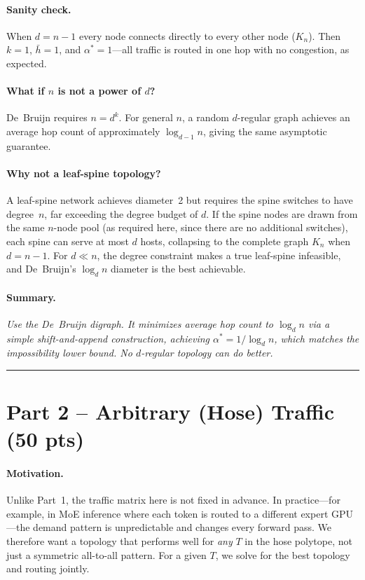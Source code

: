 \documentclass[11pt]{article}
\begin{document}
\paragraph{Sanity check.}
When $d = n-1$ every node connects directly to every other node
($K_n$). Then $k=1$, $\bar{h}=1$, and $\alpha^*=1$---all traffic is
routed in one hop with no congestion, as expected.

\paragraph{What if $n$ is not a power of $d$?}
De~Bruijn requires $n = d^k$. For general $n$, a random $d$-regular
graph achieves an average hop count of approximately $\log_{d-1} n$,
giving the same asymptotic guarantee.

\paragraph{Why not a leaf-spine topology?}
A leaf-spine network achieves diameter~2 but requires the spine switches
to have degree~$n$, far exceeding the degree budget of $d$. If the
spine nodes are drawn from the same $n$-node pool (as required here,
since there are no additional switches), each spine can serve at most
$d$ hosts, collapsing to the complete graph $K_n$ when $d = n-1$. For
$d \ll n$, the degree constraint makes a true leaf-spine infeasible, and
De~Bruijn's $\log_d n$ diameter is the best achievable.

\paragraph{Summary.}
\emph{Use the De~Bruijn digraph. It minimizes average hop count to
$\log_d n$ via a simple shift-and-append construction, achieving
$\alpha^* = 1/\log_d n$, which matches the impossibility lower bound.
No $d$-regular topology can do better.}

\bigskip\hrule\bigskip

\section*{Part 2 -- Arbitrary (Hose) Traffic (50 pts)}

\paragraph{Motivation.}
Unlike Part~1, the traffic matrix here is not fixed in advance.
In practice---for example, in MoE inference where each token is routed
to a different expert GPU---the demand pattern is unpredictable and
changes every forward pass. We therefore want a topology that performs
well for \emph{any} $T$ in the hose polytope, not just a symmetric
all-to-all pattern. For a given $T$, we solve for the best topology
and routing jointly.
\end{document}
